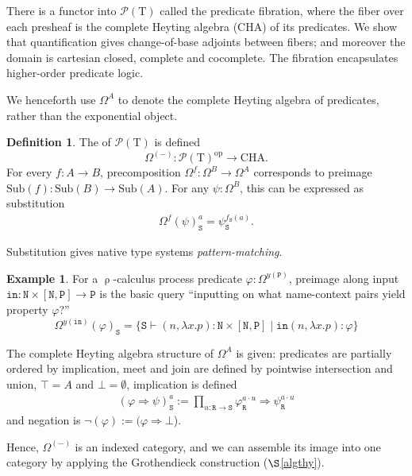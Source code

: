\documentclass[conference]{IEEEtran}
\theoremstyle{definition}
\newtheorem{definition}[theorem]{Definition}
\newtheorem{example}[theorem]{Example}
\newcommand{\define}[1]{{\bf \boldmath{#1}}}
\newcommand{\msc}[1]{\mathscr{#1}}
\newcommand{\mrm}[1]{\mathrm{#1}}
\newcommand{\mtt}[1]{\mathtt{#1}}
\newcommand{\ra}{\Rightarrow}
\newcommand{\op}{\mrm{op}}
\newcommand{\T}{\mrm{T}}
\newcommand{\Sub}{\mrm{Sub}}
\newcommand{\CHA}{\mrm{CHA}}
\newcommand{\pow}{\msc{P}}
\newcommand{\ttr}{\mtt{R}}
\newcommand{\tts}{\mtt{S}}
\newcommand{\N}{\mtt{N}}
\newcommand{\PP}{\mtt{P}}
\newcommand{\tti}{\mtt{in}}
\begin{document}
There is a functor into $\pow(\T)$ called the predicate fibration, where the fiber over each presheaf is the complete Heyting algebra (CHA) of its predicates. We show that quantification gives change-of-base adjoints between fibers; and moreover the domain is cartesian closed, complete and cocomplete. The fibration encapsulates higher-order predicate logic.

We henceforth use $\Omega^A$ to denote the complete Heyting algebra of predicates, rather than the exponential object.

\begin{definition}
    The \define{predicate functor} of $\pow(\T)$ is defined
    \[\Omega^{(-)}:\pow(\T)^\op\to \CHA.\]
    For every $f:A\to B$, precomposition $\Omega^f:\Omega^B\to \Omega^A$ corresponds to preimage $\Sub(f):\Sub(B)\to \Sub(A)$. For any $\psi:\Omega^B$, this can be expressed as substitution
    \begin{eqnarray}
        \Omega^f(\psi)_\tts^a = \psi_\tts^{f_\tts(a)}.
    \end{eqnarray}
\end{definition}

Substitution gives native type systems \textit{pattern-matching}.

\begin{example}
    For a $\uprho$-calculus process predicate $\varphi:\Omega^{y(\PP)}$, preimage along input $\tti:\N\times [\N,\PP]\to \PP$ is the basic query ``inputting on what name-context pairs yield property $\varphi$?''
    \[\Omega^{y(\tti)}(\varphi)_\tts = \{\tts\vdash (n,\lambda x.p):\N\times [\N,\PP] \;|\; \tti(n,\lambda x.p):\varphi\}\]
\end{example}

The complete Heyting algebra structure of $\Omega^A$ is given: predicates are partially ordered by implication, meet and join are defined by pointwise intersection and union, $\top = A$ and $\bot = \emptyset$, implication is defined
\begin{eqnarray}
    (\varphi\ra \psi)_\tts^a := \prod_{u:\ttr\to\tts} \varphi_\ttr^{a\cdot u}\ra \psi_\ttr^{a\cdot u}
\end{eqnarray}
and negation is $\neg(\varphi):= (\varphi \ra \bot$).

Hence, $\Omega^{(-)}$ is an indexed category, and we can assemble its image into one category by applying the Grothendieck construction ($\S$\ref{algthy}).
\end{document}
